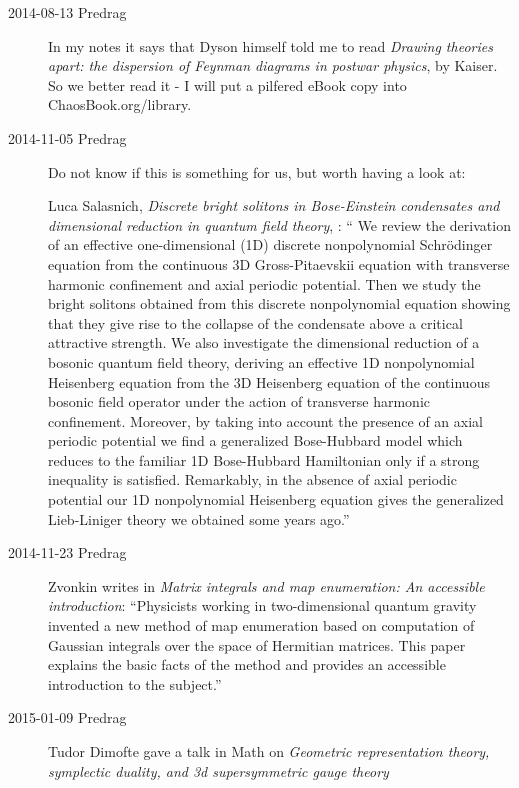 \begin{description}
\item[2014-08-13 Predrag]
In my notes it says that Dyson himself told me to read {\em Drawing
theories apart: the dispersion of {Feynman} diagrams in postwar physics},
by Kaiser. So we better read it - I will put a pilfered
eBook copy 
into ChaosBook.org/library.

\item[2014-11-05 Predrag]
Do not know if this is something for us, but worth having a look at:

Luca Salasnich,
 \emph{Discrete bright solitons in Bose-Einstein condensates and dimensional
  reduction in quantum field theory}, :
`` We  review the derivation of an effective one-dimensional (1D) discrete
nonpolynomial Schr\"odinger equation from the continuous 3D Gross-Pitaevskii
equation with transverse harmonic confinement and axial periodic potential.
Then we study the bright solitons obtained from this discrete nonpolynomial
equation showing that they give rise to the collapse of the condensate above a
critical attractive strength. We also investigate the dimensional reduction of
a bosonic quantum field theory, deriving an effective 1D nonpolynomial
Heisenberg equation from the 3D Heisenberg equation of the continuous bosonic
field operator under the action of transverse harmonic confinement. Moreover,
by taking into account the presence of an axial periodic potential we find a
generalized Bose-Hubbard model which reduces to the familiar 1D Bose-Hubbard
Hamiltonian only if a strong inequality is satisfied. Remarkably, in the
absence of axial periodic potential our 1D nonpolynomial Heisenberg equation
gives the generalized Lieb-Liniger theory we obtained some years ago.''

\item[2014-11-23 Predrag]
Zvonkin 
writes in
{\em Matrix integrals and map enumeration: {An} accessible introduction}:
``Physicists working in two-dimensional quantum gravity invented a new
method of map enumeration based on computation of Gaussian integrals over
the space of Hermitian matrices. This paper explains the basic facts of
the method and provides an accessible introduction to the subject.''

\item[2015-01-09 Predrag]

Tudor Dimofte gave a talk in Math on
{\em Geometric representation theory, symplectic duality, and 3d
supersymmetric gauge theory}


\end{description}
